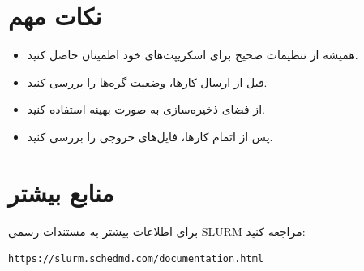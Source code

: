 \documentclass[a4paper,12pt]{article}
\begin{document}
\section{نکات مهم}
\begin{itemize}
	\item همیشه از تنظیمات صحیح برای اسکریپت‌های خود اطمینان حاصل کنید.
	\item قبل از ارسال کارها، وضعیت گره‌ها را بررسی کنید.
	\item از فضای ذخیره‌سازی به صورت بهینه استفاده کنید.
	\item پس از اتمام کارها، فایل‌های خروجی را بررسی کنید.
\end{itemize}

\section{منابع بیشتر}
برای اطلاعات بیشتر به مستندات رسمی SLURM مراجعه کنید:
\begin{latin}
\begin{verbatim}
https://slurm.schedmd.com/documentation.html
\end{verbatim}
\end{latin}
\end{document}
